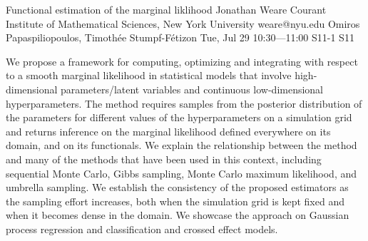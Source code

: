 \begin{talk}
  {Functional estimation of the marginal liklihood}%
  {Jonathan Weare}%
  {Courant Institute of Mathematical Sciences, New York University}%
  {weare@nyu.edu}%
  {Omiros Papaspiliopoulos, Timoth\'ee Stumpf-F\'etizon}%
  {}%
  {Tue, Jul 29 10:30---11:00}%
  {S11-1}%
  {S11}%
  
    
   
We propose a framework for computing, optimizing and integrating with respect to
a smooth marginal likelihood in statistical models that involve high-dimensional parameters/latent
variables and continuous low-dimensional hyperparameters. The method requires samples from
the posterior distribution of the parameters for different values of the hyperparameters on a simulation grid and returns inference on the marginal likelihood defined everywhere on its domain,
and on its functionals. We explain the relationship between the method and many of the methods that have been
used in this context, including sequential Monte Carlo, Gibbs sampling, Monte Carlo maximum
likelihood, and umbrella sampling. We establish the consistency of the proposed estimators as
the sampling effort increases, both when the simulation grid is kept fixed and when it becomes
dense in the domain. We showcase the approach on Gaussian process regression and classification and crossed effect models.


\end{talk}

